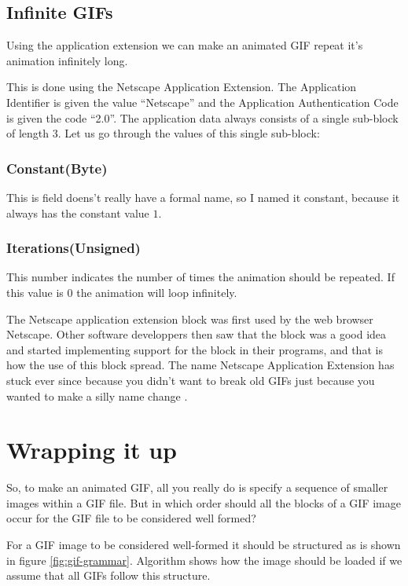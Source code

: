   \subsection{Infinite GIFs}

  Using the application extension we can make an animated GIF repeat
  it's animation infinitely long.

  This is done using the Netscape Application Extension. The
  Application Identifier is given the value ``Netscape'' and the
  Application Authentication Code is given the code ``2.0''. The
  application data always consists of a single sub-block of length
  3. Let us go through the values of this single sub-block:
  \cite{frazier97:_all_about_gif89}

  \subsubsection{Constant(Byte)}

  This is field doens't really have a formal name, so I named it
  constant, because it always has the constant value $1$.

  \subsubsection{Iterations(Unsigned)}

  This number indicates the number of times the animation should be
  repeated. If this value is $0$ the animation will loop infinitely.

  The Netscape application extension block was first used by the web
  browser Netscape. Other software developpers then saw that the block
  was a good idea and started implementing support for the block in
  their programs, and that is how the use of this block spread. The
  name Netscape Application Extension has stuck ever since because you
  didn't want to break old GIFs just because you wanted to make a
  silly name change \cite{walte96:_web_scrip_secret_weapon}.

  \section{Wrapping it up}

  So, to make an animated GIF, all you really do is specify a sequence
  of smaller images within a GIF file. But in which order should all
  the blocks of a GIF image occur for the GIF file to be considered
  well formed?

  For a GIF image to be considered well-formed it should be structured
  as is shown in figure \ref{fig:gif-grammar}. Algorithm shows how the
  image should be loaded if we assume that all GIFs follow this
  structure.

